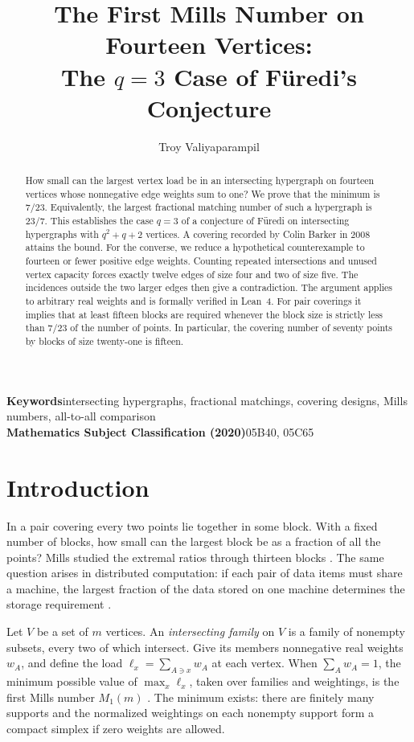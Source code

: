 \documentclass[11pt]{article}
\title{The First Mills Number on Fourteen Vertices:\\
The \(q=3\) Case of F\"uredi's Conjecture}
\author{Troy Valiyaparampil}
\date{}
\begin{document}
\maketitle
\begin{abstract}
How small can the largest vertex load be in an intersecting hypergraph
on fourteen vertices whose nonnegative edge weights sum to one? We prove
that the minimum is \(7/23\). Equivalently, the largest fractional
matching number of such a hypergraph is \(23/7\). This establishes the
case \(q=3\) of a conjecture of F\"uredi on intersecting hypergraphs
with \(q^2+q+2\) vertices. A covering recorded by Colin Barker in 2008
attains the bound. For the converse, we reduce a hypothetical counterexample
to fourteen or fewer positive edge weights. Counting repeated
intersections and unused vertex capacity forces exactly twelve edges of
size four and two of size five. The incidences outside the two larger
edges then give a contradiction. The argument applies to arbitrary real
weights and is formally verified in Lean~4. For pair coverings it implies
that at least fifteen blocks are required whenever the block size is
strictly less than \(7/23\) of the number of points. In particular, the
covering number of seventy points by blocks of size twenty-one is fifteen.
\end{abstract}
\noindent\textbf{Keywords}\quad intersecting hypergraphs, fractional matchings,
covering designs, Mills numbers, all-to-all comparison\\
\textbf{Mathematics Subject Classification (2020)}\quad 05B40, 05C65

\section{Introduction}
In a pair covering every two points lie together in some block. With a
fixed number of blocks, how small can the largest block be as a fraction
of all the points? Mills studied the extremal ratios through thirteen
blocks \cite{mills}. The same question arises in distributed computation:
if each pair of data items must share a machine, the largest fraction
of the data stored on one machine determines the storage requirement
\cite{hhs}.

Let \(V\) be a set of \(m\) vertices. An \emph{intersecting family} on
\(V\) is a family of nonempty subsets, every two of which intersect.
Give its members nonnegative real weights \(w_A\), and define the
load \(\ell_x=\sum_{A\ni x}w_A\) at each vertex. When \(\sum_A w_A=1\),
the minimum possible value of \(\max_x\ell_x\), taken over families
and weightings, is the first Mills number \(M_1(m)\) \cite{gk}.
The minimum exists: there are finitely many supports and the normalized
weightings on each nonempty support form a compact simplex if zero
weights are allowed.
\end{document}
